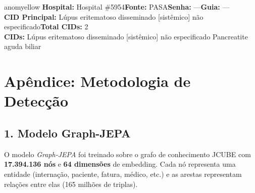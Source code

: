 \documentclass[a4paper,10pt]{article}
\begin{document}
\begin{anomalycard}[Interna\c{c}\~{a}o \#185705 | Pac. \#111286 | MODERADO (z=2.18) | LOS: 11d | 28/02/2026\,$\to$\,11/03/2026]{anomyellow}
\textbf{Hospital:} Hospital \#5954\quad \textbf{Fonte:} PASA\quad \textbf{Senha:} ---\quad \textbf{Guia:} ---\\

\textbf{CID Principal:} {\small Lúpus eritematoso disseminado [sistêmico] não especificado}\quad\textbf{Total CIDs:} 2\\

\textbf{CIDs:} {\scriptsize Lúpus eritematoso disseminado [sistêmico] não especificado \textbar{} Pancreatite aguda biliar}\\




\end{anomalycard}


\clearpage
\section*{Ap\^{e}ndice: Metodologia de Detec\c{c}\~{a}o}

\subsection*{1. Modelo Graph-JEPA}
O modelo \textit{Graph-JEPA} foi treinado sobre o grafo de conhecimento JCUBE com \textbf{17.394.136 n\'{o}s}
e \textbf{64 dimens\~{o}es} de embedding. Cada n\'{o} representa uma entidade (interna\c{c}\~{a}o, paciente,
fatura, m\'{e}dico, etc.) e as arestas representam rela\c{c}\~{o}es entre elas (165 milh\~{o}es de triplas).
\end{document}
